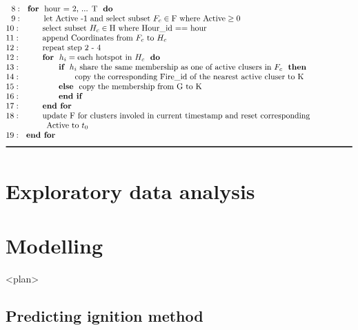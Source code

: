 \documentclass{monashthesis}
\begin{document}
\begin{table}
\begin{align*}
&~~8:~~\textbf{for}~~\text{hour = 2, ... T}~~\textbf{do} \\[-1\jot]
&~~9:~~~~~~~~\text{let Active -1 and select subset }F_c \in \text{F where Active} \geq 0\\[-1\jot]
&10:~~~~~~~~\text{select subset }H_c \in \text{H where Hour\textunderscore id == hour}\\[-1\jot]
&11:~~~~~~~~\text{append Coordinates from }F_c~\text{to}~H_c\\[-1\jot]
&12:~~~~~~~~\text{repeat step 2 - 4}\\[-1\jot]
&12:~~~~~~~~\textbf{for}~~h_i = \text{each hotspot in }H_c~~\textbf{do}\\[-1\jot]
&13:~~~~~~~~~~~~~~\textbf{if}~~h_i~\text{share the same membership as one of active clusers in }F_c~~\textbf{then}\\[-1\jot]
&14:~~~~~~~~~~~~~~~~~~~~\text{copy the corresponding Fire\textunderscore id of the nearest active cluser to K}\\[-1\jot]
&15:~~~~~~~~~~~~~~\textbf{else}~~\text{copy the membership from G to K}\\[-1\jot]
&16:~~~~~~~~~~~~~~\textbf{end if}\\[-1\jot]
&17:~~~~~~~~\textbf{end for}\\[-1\jot]
&18:~~~~~~~~\text{update F for clusters involed in current timestamp and reset corresponding}\\[-1\jot]
&~~~~~~~~~~~~~~~\text{Active to }t_0\\[-1\jot]
&19:~~\textbf{end for}\\[-1\jot]
&\rule{150mm}{0.5mm}
\end{align*}
\end{table}

\chapter{Exploratory data analysis}\label{exploratory-data-analysis}

\chapter{Modelling}\label{modelling}

\textless{}plan\textgreater{}

\section{Predicting ignition method}\label{predicting-ignition-method}
\end{document}
